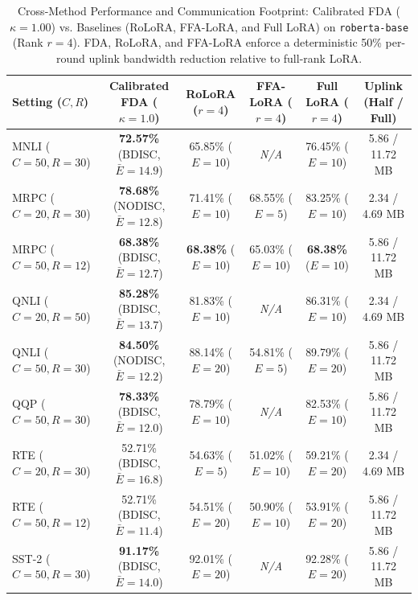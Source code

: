 \documentclass[10pt,a4paper]{article}
\begin{document}
\begin{table}[H]
\centering
\caption{Cross-Method Performance and Communication Footprint: Calibrated FDA ($\kappa=1.00$) vs. Baselines (RoLoRA, FFA-LoRA, and Full LoRA) on \texttt{roberta-base} (Rank $r=4$). FDA, RoLoRA, and FFA-LoRA enforce a deterministic 50\% per-round uplink bandwidth reduction relative to full-rank LoRA.}
\label{tab:calib_vs_baselines_master}
\scriptsize
\setlength{\tabcolsep}{1.8pt}
\begin{tabular*}{\textwidth}{@{\extracolsep{\fill}}lccccc@{}}
\toprule
\textbf{Setting ($C, R$)} & \textbf{Calibrated FDA ($\kappa=1.0$)} & \textbf{RoLoRA ($r=4$)} & \textbf{FFA-LoRA ($r=4$)} & \textbf{Full LoRA ($r=4$)} & \textbf{Uplink (Half / Full)} \\
\midrule
MNLI ($C=50, R=30$) & \textbf{72.57\%} (BDISC, $\bar{E}=14.9$) & 65.85\% ($E=10$) & \textit{N/A} & 76.45\% ($E=10$) & 5.86 / 11.72 MB \\
MRPC ($C=20, R=30$) & \textbf{78.68\%} (NODISC, $\bar{E}=12.8$) & 71.41\% ($E=10$) & 68.55\% ($E=5$) & 83.25\% ($E=10$) & 2.34 / 4.69 MB \\
MRPC ($C=50, R=12$) & \textbf{68.38\%} (BDISC, $\bar{E}=12.7$) & \textbf{68.38\%} ($E=10$) & 65.03\% ($E=10$) & \textbf{68.38\%} ($E=10$) & 5.86 / 11.72 MB \\
QNLI ($C=20, R=50$) & \textbf{85.28\%} (BDISC, $\bar{E}=13.7$) & 81.83\% ($E=10$) & \textit{N/A} & 86.31\% ($E=10$) & 2.34 / 4.69 MB \\
QNLI ($C=50, R=30$) & \textbf{84.50\%} (NODISC, $\bar{E}=12.2$) & 88.14\% ($E=20$) & 54.81\% ($E=5$) & 89.79\% ($E=20$) & 5.86 / 11.72 MB \\
QQP ($C=50, R=30$) & \textbf{78.33\%} (BDISC, $\bar{E}=12.0$) & 78.79\% ($E=10$) & \textit{N/A} & 82.53\% ($E=10$) & 5.86 / 11.72 MB \\
RTE ($C=20, R=30$) & 52.71\% (BDISC, $\bar{E}=16.8$) & 54.63\% ($E=5$) & 51.02\% ($E=10$) & 59.21\% ($E=20$) & 2.34 / 4.69 MB \\
RTE ($C=50, R=12$) & 52.71\% (BDISC, $\bar{E}=11.4$) & 54.51\% ($E=20$) & 50.90\% ($E=10$) & 53.91\% ($E=20$) & 5.86 / 11.72 MB \\
SST-2 ($C=50, R=30$) & \textbf{91.17\%} (BDISC, $\bar{E}=14.0$) & 92.01\% ($E=20$) & \textit{N/A} & 92.28\% ($E=20$) & 5.86 / 11.72 MB \\
\bottomrule
\end{tabular*}
\end{table}
\end{document}

